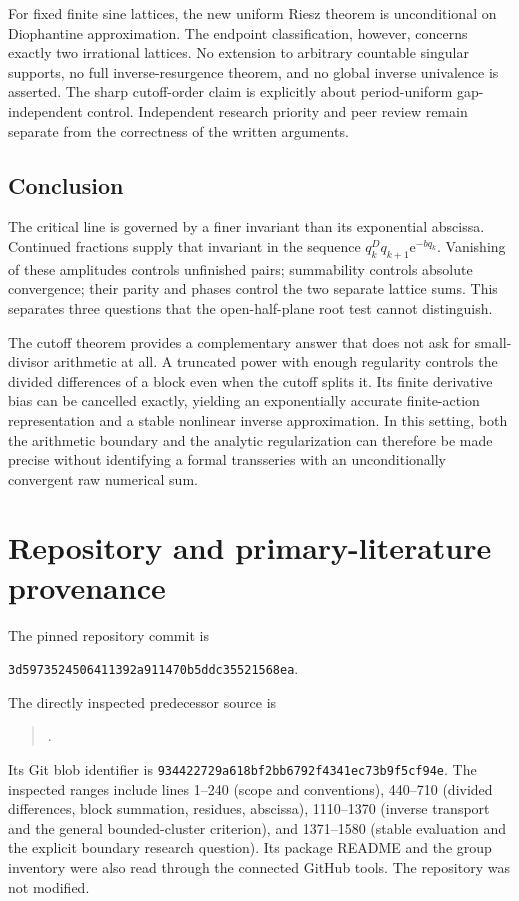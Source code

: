 \documentclass[11pt,a4paper]{article}
\numberwithin{equation}{section}
\theoremstyle{definition}
\theoremstyle{remark}
\newcommand{\e}{\mathrm e}
\begin{document}
For fixed finite sine lattices, the new uniform Riesz theorem is
unconditional on Diophantine approximation. The endpoint classification,
however, concerns exactly two irrational lattices. No extension to
arbitrary countable singular supports, no full inverse-resurgence
theorem, and no global inverse univalence is asserted. The sharp
cutoff-order claim is explicitly about period-uniform gap-independent
control. Independent research priority and peer review remain separate
from the correctness of the written arguments.

\subsection{Conclusion}
The critical line is governed by a finer invariant than its exponential
abscissa. Continued fractions supply that invariant in the sequence
$q_k^Dq_{k+1}\e^{-bq_k}$. Vanishing of these amplitudes controls unfinished
pairs; summability controls absolute convergence; their parity and
phases control the two separate lattice sums. This separates three
questions that the open-half-plane root test cannot distinguish.

The cutoff theorem provides a complementary answer that does not ask
for small-divisor arithmetic at all. A truncated power with enough
regularity controls the divided differences of a block even when the
cutoff splits it. Its finite derivative bias can be cancelled exactly,
yielding an exponentially accurate finite-action representation and a
stable nonlinear inverse approximation. In this setting, both the
arithmetic boundary and the analytic regularization can therefore be
made precise without identifying a formal transseries with an
unconditionally convergent raw numerical sum.

\appendix
\section{Repository and primary-literature provenance}
\label{app:sources}
The pinned repository commit is
\begin{center}
\texttt{3d5973524506411392a911470b5ddc35521568ea}.
\end{center}
The directly inspected predecessor source is
\begin{quote}\small
{}.
\end{quote}
Its Git blob identifier is
\texttt{934422729a618bf2bb6792f4341ec73b9f5cf94e}.
The inspected ranges include lines 1--240 (scope and conventions),
440--710 (divided differences, block summation, residues, abscissa),
1110--1370 (inverse transport and the general bounded-cluster criterion),
and 1371--1580 (stable evaluation and the explicit boundary research
question). Its package README and the group inventory were also read
through the connected GitHub tools. The repository was not modified.
\end{document}
